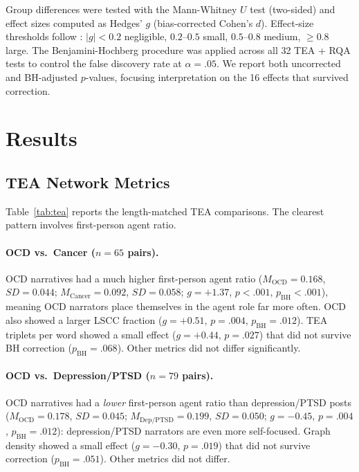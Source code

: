 \documentclass[11pt,a4paper]{article}
\begin{document}
Group differences were tested with the Mann-Whitney $U$ test (two-sided) and effect sizes computed as Hedges' $g$ (bias-corrected Cohen's $d$). Effect-size thresholds follow \citet{cohen1988}: $|g| < 0.2$ negligible, $0.2$--$0.5$ small, $0.5$--$0.8$ medium, $\geq 0.8$ large. The Benjamini-Hochberg procedure was applied across all 32 TEA + RQA tests to control the false discovery rate at $\alpha = .05$. We report both uncorrected and BH-adjusted $p$-values, focusing interpretation on the 16 effects that survived correction.

\section{Results}

\subsection{TEA Network Metrics}

Table~\ref{tab:tea} reports the length-matched TEA comparisons. The clearest pattern involves first-person agent ratio.

\paragraph{OCD vs.\ Cancer ($n = 65$ pairs).}
OCD narratives had a much higher first-person agent ratio ($M_\mathrm{OCD} = 0.168$, $SD = 0.044$; $M_\mathrm{Cancer} = 0.092$, $SD = 0.058$; $g = +1.37$, $p < .001$, $p_\mathrm{BH} < .001$), meaning OCD narrators place themselves in the agent role far more often. OCD also showed a larger LSCC fraction ($g = +0.51$, $p = .004$, $p_\mathrm{BH} = .012$). TEA triplets per word showed a small effect ($g = +0.44$, $p = .027$) that did not survive BH correction ($p_\mathrm{BH} = .068$). Other metrics did not differ significantly.

\paragraph{OCD vs.\ Depression/PTSD ($n = 79$ pairs).}
OCD narratives had a \emph{lower} first-person agent ratio than depression/PTSD posts ($M_\mathrm{OCD} = 0.178$, $SD = 0.045$; $M_\mathrm{Dep/PTSD} = 0.199$, $SD = 0.050$; $g = -0.45$, $p = .004$, $p_\mathrm{BH} = .012$): depression/PTSD narrators are even more self-focused. Graph density showed a small effect ($g = -0.30$, $p = .019$) that did not survive correction ($p_\mathrm{BH} = .051$). Other metrics did not differ.
\end{document}

